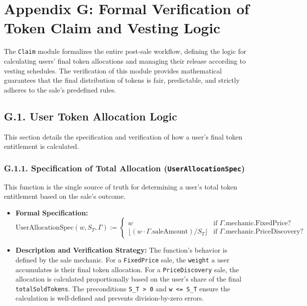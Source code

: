 \documentclass[
  english,
  onecolumn]{article}
\providecommand{\tightlist}{%
  \setlength{\itemsep}{0pt}\setlength{\parskip}{0pt}}
\begin{document}
\section{Appendix G: Formal Verification of Token Claim and Vesting
Logic}\label{appendix-g-formal-verification-of-token-claim-and-vesting-logic}

The \texttt{Claim} module formalizes the entire post-sale workflow,
defining the logic for calculating users' final token allocations and
managing their release according to vesting schedules. The verification
of this module provides mathematical guarantees that the final
distribution of tokens is fair, predictable, and strictly adheres to the
sale's predefined rules.

\subsection{G.1. User Token Allocation
Logic}\label{g.1.-user-token-allocation-logic}

This section details the specification and verification of how a user's
final token entitlement is calculated.

\subsubsection{\texorpdfstring{G.1.1. Specification of Total Allocation
(\texttt{UserAllocationSpec})}{G.1.1. Specification of Total Allocation (UserAllocationSpec)}}\label{g.1.1.-specification-of-total-allocation-userallocationspec}

This function is the single source of truth for determining a user's
total token entitlement based on the sale's outcome.

\begin{itemize}
\tightlist
\item
  \textbf{Formal Specification:} \[
  \text{UserAllocationSpec}(w, S_T, \Gamma) := \begin{cases}
  w & \text{if } \Gamma.\text{mechanic.FixedPrice?} \\
  \lfloor (w \cdot \Gamma.\text{saleAmount}) / S_T \rfloor & \text{if } \Gamma.\text{mechanic.PriceDiscovery?}
  \end{cases}
  \]
\item
  \textbf{Description and Verification Strategy:} The function's
  behavior is defined by the sale mechanic. For a \texttt{FixedPrice}
  sale, the \texttt{weight} a user accumulates is their final token
  allocation. For a \texttt{PriceDiscovery} sale, the allocation is
  calculated proportionally based on the user's share of the final
  \texttt{totalSoldTokens}. The preconditions
  \texttt{S\_T\ \textgreater{}\ 0} and \texttt{w\ \textless{}=\ S\_T}
  ensure the calculation is well-defined and prevents division-by-zero
  errors.
\end{itemize}
\end{document}
